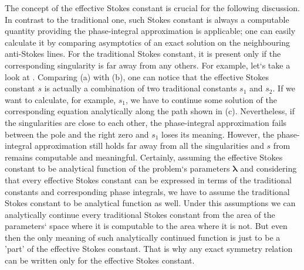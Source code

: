 \documentclass[12pt]{iopart}
\def\lmbd{\bm{\lambda}}
\begin{document}
The concept of the effective Stokes constant is crucial for the following discussion. 
In contrast to the traditional one, such Stokes constant is always a computable quantity
providing the phase-integral approximation is applicable; one 
can easily calculate it by comparing asymptotics of an exact solution on the 
neighbouring anti-Stokes lines. For the traditional Stokes constant, it is present only if the
corresponding singularity is far away from any others. 
For example, let`s take a look at . Comparing (a) with (b),
one can notice that the effective Stokes constant $s$ is actually a combination of
two traditional constants $s_1$ and $s_2$. If we want to calculate, for example, $s_1$, we have to continue 
some solution of the corresponding equation analytically along the path shown in  (c). Nevertheless,
if the singularities are close to each other, the phase-integral approximation fails between the pole
and the right zero and $s_1$ loses its meaning. However, the phase-integral approximation still holds
far away from all the singularities and $s$ from  remains computable and meaningful. 
Certainly, assuming the effective Stokes constant to be analytical function of the problem`s parameters $\lmbd$
and considering that every effective Stokes constant can be expressed in terms of the traditional constants 
and corresponding phase integrals, we have to assume the traditional Stokes constant to be analytical
function as well. Under this assumptions we can analytically continue every traditional Stokes constant
from the area of the parameters` space where it is computable to the area where it is not. But even then
the only meaning of such analytically continued function is just to be a 'part' of the effective Stokes constant.
That is why any exact symmetry relation can be written only for the effective Stokes constant.
\end{document}
